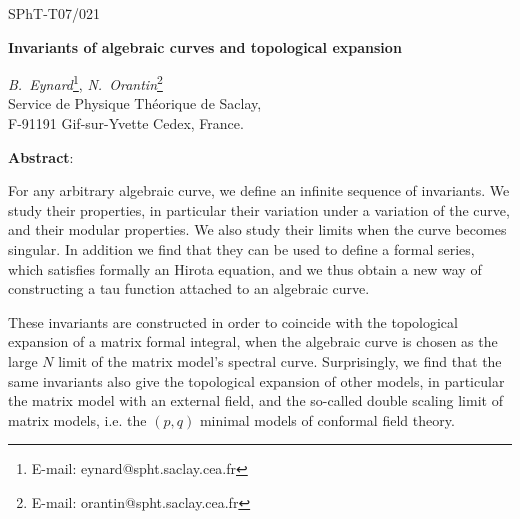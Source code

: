 \documentclass[12pt]{article}
\begin{document}
\sloppy





\pagestyle{empty}
\hfill SPhT-T07/021
\addtolength{\baselineskip}{0.20\baselineskip}
\begin{center}
\vspace{26pt}
{\large \bf {Invariants of algebraic curves and topological expansion}}
\newline
\vspace{26pt}


{\sl B.\ Eynard}\hspace*{0.05cm}\footnote{ E-mail: eynard@spht.saclay.cea.fr }, {\sl N.\ Orantin}\hspace*{0.05cm}\footnote{ E-mail: orantin@spht.saclay.cea.fr }\\
\vspace{6pt}
Service de Physique Th\'{e}orique de Saclay,\\
F-91191 Gif-sur-Yvette Cedex, France.\\
\end{center}

\vspace{20pt}
\begin{center}
{\bf Abstract}:
\end{center}



%


For any arbitrary algebraic curve, we define an infinite sequence of invariants.
We study their properties, in particular their variation under a variation of the curve, and their modular properties. We also study their limits when the curve becomes singular.
In addition we find that they can be used to define a formal series, which satisfies formally an Hirota equation, and we thus obtain a new way of constructing a tau function attached to an algebraic curve.

These invariants are constructed in order to coincide with the topological expansion of a matrix formal integral, when the algebraic curve is chosen as the large $N$ limit of the matrix model's spectral curve.
Surprisingly, we find that the same invariants also give the topological expansion of other models, in particular the matrix model with an external field, and the so-called double scaling limit of matrix models, i.e. the $(p,q)$ minimal models of conformal field theory.
\end{document}
